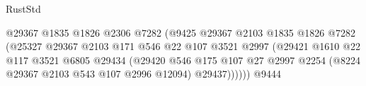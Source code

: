 \begin{lexlean}{RustStd}
\begin{coremodule}
{\begin{coremodule}
{{{{{{{{{{{{{{{{{{{{{{{{{{{{{{{{{{                                                  @29367
                                                  @1835
                                                  @1826
                                                  @2306
                                                  @7282
                                                  (@9425
                                                    @29367
                                                    @2103
                                                    @1835
                                                    @1826
                                                    @7282
                                                    (@25327
                                                      @29367
                                                      @2103
                                                      @171
                                                      @546
                                                      @22
                                                      @107
                                                      @3521
                                                      @2997
                                                      (@29421
                                                        @1610
                                                        @22
                                                        @117
                                                        @3521
                                                        @6805
                                                        @29434
                                                        (@29420
                                                          @546
                                                          @175
                                                          @107
                                                          @27
                                                          @2997
                                                          @2254
                                                          (@8224
                                                            @29367
                                                            @2103
                                                            @543
                                                            @107
                                                            @2996
                                                            @12094)
                                                          @29437))))))
                                              @9444
}}}}}}}}}}}}}}}}}}}}}}}}}}}}}}}}}}
\end{coremodule}}
\end{coremodule}
\end{lexlean}
